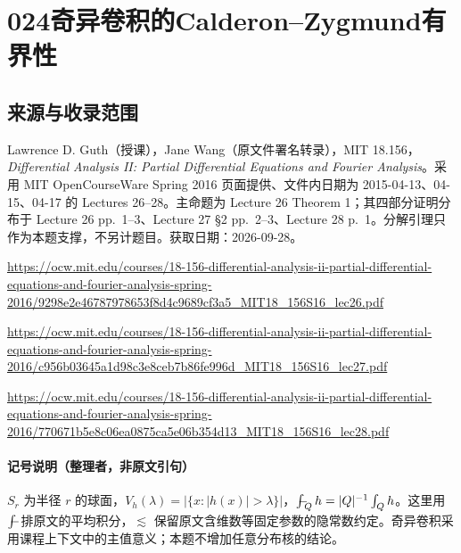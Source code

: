\documentclass[UTF8,11pt]{ctexart}
\theoremstyle{definition}
\providecommand{\fint}{\mathop{\rlap{\hspace{0.18em}$-$}\!\int}}
\begin{document}
\section*{024\quad 奇异卷积的Calderon--Zygmund有界性}
\subsection*{来源与收录范围}
Lawrence D. Guth（授课），Jane Wang（原文件署名转录），MIT 18.156，\emph{Differential Analysis II: Partial Differential Equations and Fourier Analysis}。采用 MIT OpenCourseWare Spring 2016 页面提供、文件内日期为 2015-04-13、04-15、04-17 的 Lectures 26--28。主命题为 Lecture 26 Theorem 1；其四部分证明分布于 Lecture 26 pp.~1--3、Lecture 27 \S2 pp.~2--3、Lecture 28 p.~1。分解引理只作为本题支撑，不另计题目。获取日期：2026-09-28。
\par\url{https://ocw.mit.edu/courses/18-156-differential-analysis-ii-partial-differential-equations-and-fourier-analysis-spring-2016/9298e2e46787978653f8d4c9689cf3a5_MIT18_156S16_lec26.pdf}
\par\url{https://ocw.mit.edu/courses/18-156-differential-analysis-ii-partial-differential-equations-and-fourier-analysis-spring-2016/c956b03645a1d98c3e8ceb7b86fe996d_MIT18_156S16_lec27.pdf}
\par\url{https://ocw.mit.edu/courses/18-156-differential-analysis-ii-partial-differential-equations-and-fourier-analysis-spring-2016/770671b5e8c06ea0875ca5e06b354d13_MIT18_156S16_lec28.pdf}
\paragraph{记号说明（整理者，非原文引句）} $S_r$ 为半径 $r$ 的球面，$V_h(\lambda)=|\{x:|h(x)|>\lambda\}|$，$\fint_Q h=|Q|^{-1}\int_Qh$。这里用 $\fint$ 排原文的平均积分，$\lesssim$ 保留原文含维数等固定参数的隐常数约定。奇异卷积采用课程上下文中的主值意义；本题不增加任意分布核的结论。
\end{document}
